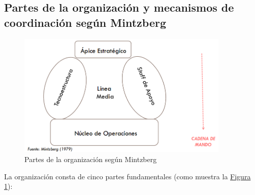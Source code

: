 \documentclass[12pt,a4paper,spanish]{report}
\begin{document}
		\subsection{\textcolor[rgb]{0.5,0.1,0.4}Partes de la organización y mecanismos de coordinación según Mintzberg}
			\begin{figure}
			 	\centering
			 		\includegraphics[width=0.9\textwidth]{9}
			 	\caption{Partes de la organización según Mintzberg}
			 	\label{organizacion_mintz}
			\end{figure}
			La organización consta de cinco partes fundamentales (como muestra la \hyperref[organizacion_mintz]{Figura \ref*{organizacion_mintz}}):
\end{document}
